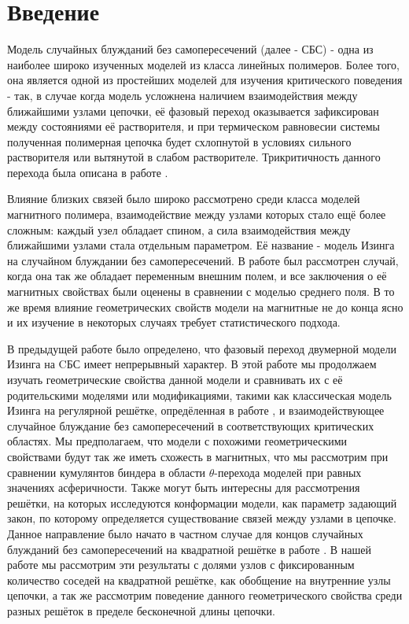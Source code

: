 \section{Введение}

Модель случайных блужданий без самопересечений (далее - СБС) - одна из наиболее широко изученных моделей из класса линейных полимеров. 
Более того, она является одной из простейших моделей для изучения критического поведения - так, в случае когда модель усложнена наличием взаимодействия между ближайшими узлами цепочки, её фазовый переход оказывается зафиксирован между состояниями её растворителя, и при термическом равновесии системы полученная полимерная цепочка будет схлопнутой в условиях сильного растворителя или вытянутой в слабом растворителе.
Трикритичность данного перехода была описана в работе \cite{Gennes1979}.

Влияние близких связей было широко рассмотрено среди класса моделей магнитного полимера, взаимодействие между узлами которых стало ещё более сложным:
каждый узел обладает спином, а сила взаимодействия между ближайшими узлами стала отдельным параметром. 
Её название - модель Изинга на случайном блуждании без самопересечений.
В работе \cite{Garel1999} был рассмотрен случай, когда она так же обладает переменным внешним полем, и все заключения о её магнитных свойствах были оценены в сравнении с моделью среднего поля.
В то же время влияние геометрических свойств модели на магнитные не до конца ясно и их изучение в некоторых случаях требует статистического подхода.

В предыдущей работе \cite{faizullina2021critical} было определено, что фазовый переход двумерной модели Изинга на CБС
имеет непрерывный характер. 
В этой работе мы продолжаем изучать геометрические свойства данной модели и сравнивать их с её родительскими моделями или модификациями, такими как классическая модель Изинга на регулярной решётке, опредёленная в работе \cite{selke2006critical}, и взаимодействующее случайное блуждание без самопересечений в соответствующих критических областях. 
Мы предполагаем, что модели с похожими геометрическими свойствами будут так же иметь схожесть в магнитных, что мы рассмотрим при сравнении кумулянтов биндера в области $\theta$-перехода моделей при равных значениях асферичности.
Также могут быть интересны для рассмотрения решётки, на которых исследуются конформации модели, как параметр задающий закон, по которому определяется существование связей между узлами в цепочке. 
Данное направление было начато в частном случае для концов случайных блужданий без самопересечений на квадратной решётке в работе \cite{owczarek2008scaling}. 
В нашей работе мы рассмотрим эти результаты с долями узлов с фиксированным количество соседей на квадратной решётке, как обобщение на внутренние узлы цепочки, а так же рассмотрим поведение данного геометрического свойства среди разных решёток в пределе бесконечной длины цепочки.  


